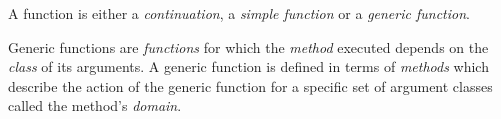 \begin{optDefinition}
\begin{definitions}

     A function is either a {\em
        continuation}, a {\em simple function} or a {\em generic function}.

      Generic
    functions are {\em functions} for which the {\em method} executed depends on
    the {\em class} of its arguments.  A generic function is defined in terms of
    {\em methods} which describe the action of the generic function for a
    specific set of argument classes called the method's {\em domain}.



\end{definitions}
\end{optDefinition}
